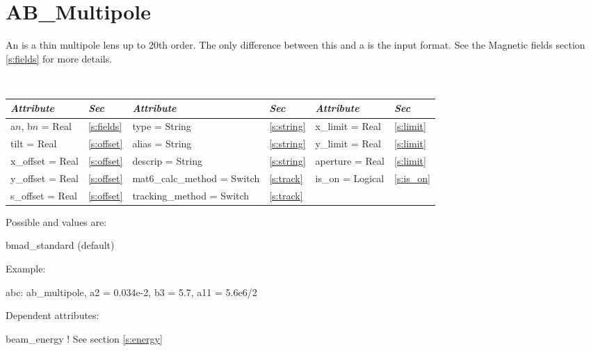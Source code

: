 \vfil
\break

\section{AB\_Multipole}
\label{s:ab_m}

An  is a thin multipole lens up to 20th order. The only
difference between this and a  is the input format. See the 
Magnetic fields section \ref{s:fields} for more details.

\begin{table}[h]
\centering 
{\tt
\begin{tabular}{|l|l||l|l||l|l|} \hline
  {\sl Attribute} & {\sl Sec}  & {\sl Attribute} & {\sl Sec} & {\sl Attribute} & {\sl Sec} \\ \hline
  a$n$, b$n$ = Real  &  \ref{s:fields} &  type = String                & \ref{s:string} & x\_limit = Real  & \ref{s:limit} \\ \hline
  tilt       = Real  &  \ref{s:offset} &  alias = String               & \ref{s:string} & y\_limit = Real  & \ref{s:limit} \\ \hline
  x\_offset  = Real  &  \ref{s:offset} &  descrip = String             & \ref{s:string} & aperture = Real  & \ref{s:limit} \\ \hline
  y\_offset  = Real  &  \ref{s:offset} &  mat6\_calc\_method = Switch  & \ref{s:track}  & is\_on = Logical & \ref{s:is_on} \\ \hline
  s\_offset  = Real  &  \ref{s:offset} &  tracking\_method = Switch    & \ref{s:track}  &                  &               \\ \hline
\end{tabular}
}
\end{table}

\noindent
Possible  and  values are:
\vskip 0.01in
\begin{example}
   bmad\_standard  (default) 
\end{example}

\vskip0.2in \noindent
Example:
\begin{example}
  abc: ab_multipole, a2 = 0.034e-2, b3 = 5.7, a11 = 5.6e6/2
\end{example}

\vskip0.1in \noindent
Dependent attributes:
\begin{example}
  beam\_energy  ! See section \ref{s:energy}
\end{example}

